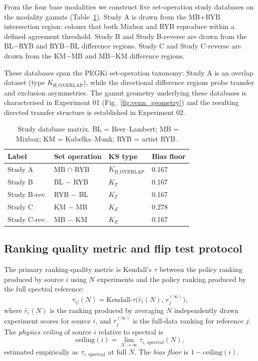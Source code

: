 \documentclass[twoside,twocolumn,9pt]{article}
\begin{document}
From the four base modalities we construct five set-operation study databases on the modality gamuts (Table~\ref{tab:study_matrix}). Study A is drawn from the MB+RYB intersection region: colours that both Mixbox and RYB reproduce within a defined agreement threshold. Study B and Study B-reverse are drawn from the BL$-$RYB and RYB$-$BL difference regions. Study C and Study C-reverse are drawn from the KM$-$MB and MB$-$KM difference regions.

These databases span the PEGKi set-operation taxonomy: Study A is an overlap dataset (type $K_{\mathrm{H\_OVERLAP}}$), while the directional difference regions probe transfer and exclusion asymmetries. The gamut geometry underlying these databases is characterised in Experiment 01 (Fig.~\ref{fig:venn_geometry}) and the resulting directed transfer structure is established in Experiment 02.

\begin{table}[h]
\small
\caption{\ Study database matrix. BL = Beer--Lambert; MB = Mixbox; KM = Kubelka--Munk; RYB = artist RYB.}
\label{tab:study_matrix}
\begin{tabular*}{0.48\textwidth}{@{\extracolsep{\fill}}llll}
\hline
\textbf{Label} & \textbf{Set operation} & \textbf{KS type} & \textbf{Bias floor} \\
\hline
Study A & MB $\cap$ RYB & $K_{\mathrm{H\_OVERLAP}}$ & 0.167 \\
Study B & BL $-$ RYB   & $K_T$                     & 0.167 \\
Study B-rev. & RYB $-$ BL & $K_T$                  & 0.167 \\
Study C & KM $-$ MB     & $K_E$                     & 0.278 \\
Study C-rev. & MB $-$ KM & $K_E$                   & 0.167 \\
\hline
\end{tabular*}
\end{table}

\subsection{Ranking quality metric and flip test protocol}

The primary ranking-quality metric is Kendall's $\tau$\cite{Kendall1938TauCorrelation} between the policy ranking produced by source $i$ using $N$ experiments and the policy ranking produced by the full spectral reference:
\[
\tau_{ij}(N) = \mathrm{Kendall\text{-}}\tau\!\bigl(\hat{r}_i(N),\, r_j^{(\infty)}\bigr),
\]
where $\hat{r}_i(N)$ is the ranking produced by averaging $N$ independently drawn experiment scores for source $i$, and $r_j^{(\infty)}$ is the full-data ranking for reference $j$. The \emph{physics ceiling} of source $i$ relative to spectral is
\[
\mathrm{ceiling}(i) = \lim_{N \to \infty} \tau_{i,\,\mathrm{spectral}}(N),
\]
estimated empirically as $\tau_{i,\,\mathrm{spectral}}$ at full $N$. The \emph{bias floor} is $1 - \mathrm{ceiling}(i)$.
\end{document}
